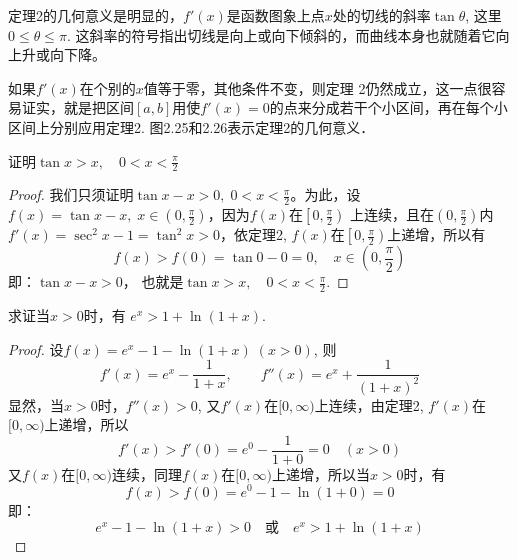 定理2的几何意义是明显的，$f'(x)$是函数图象上点$x$处的切线的斜率$\tan\theta$, 这里$0\le\theta \le \pi$. 这斜率的符号指出切线是向上或向下倾斜的，而曲线本身也就随着它向上升或向下降。

如果$f'(x)$在个别的$x$值等于零，其他条件不变，则定理
2仍然成立，这一点很容易证实，就是把区间$[a,b]$用使$f'(x)=0$的点来分成若干个小区间，再在每个小区间上分别应用定理2. 图2.25和2.26表示定理2的几何意义．

\begin{figure}[htp]
    \centering
    \begin{minipage}[t]{0.48\textwidth}
    \centering
\begin{tikzpicture}[>=latex, scale=1]
    
\end{tikzpicture}
    \caption{}
    \end{minipage}
    \begin{minipage}[t]{0.48\textwidth}
    \centering
    \begin{tikzpicture}[>=latex, scale=1.5]
       
    \end{tikzpicture}
    \caption{}
    \end{minipage}
    \end{figure}



\begin{example}
证明$\tan x>x,\quad 0<x<\frac{\pi}{2}$
\end{example}


\begin{proof}
我们只须证明$\tan x-x>0,\; 0<x<\frac{\pi}{2}$。为此，设$f(x)=\tan x-x,\; x\in\left(0,\frac{\pi}{2}\right)$，因为$f(x)$在$\left[0,\frac{\pi}{2}\right)$
上连续，且在$\left(0,\frac{\pi}{2}\right)$内$f'(x)=\sec^2x-1=\tan^2 x>0$，依定理2, $f(x)$在$\left[0,\frac{\pi}{2}\right)$上递增，所以有
\[f (x) > f (0) =\tan 0-0=0,\quad x\in \left(0,\frac{\pi}{2}\right)\]
即：$\tan x-x>0$，
也就是$\tan x>x,\quad 0<x<\frac{\pi}{2}$.
\end{proof}

\begin{example}
        求证当$x>0$时，有
$e^x> 1+\ln (1+x) $.
\end{example}


\begin{proof}
设$f(x)=e^x-1-\ln(1+x)\; (x>0)$, 则
\[f' (x) =e^x-\frac{1}{1+x},\qquad 
f''(x) =e^x +\frac{1}{(1+x)^2}\] 
    显然，当$x>0$时，$f''(x)>0$, 又$f'(x)$在$[0,\infty)$上连续，由定理2, $f'(x)$在$[0,\infty)$上递增，所以
\[f' (x) > f' (0) =e^0-\frac{1}{1+0}=0\quad  (x> 0) \]
又$f(x)$在$[0, \infty)$连续，同理$f(x)$在$[0, \infty)$上递增，所以当$x>0$时，有
\[f (x) > f (0) =e^0-1-\ln (1+0) =0\]
即：
\[e^x-1-\ln(1+x)>0\quad \text{或}\quad e^x>1+\ln(1+x)\]
\end{proof}



